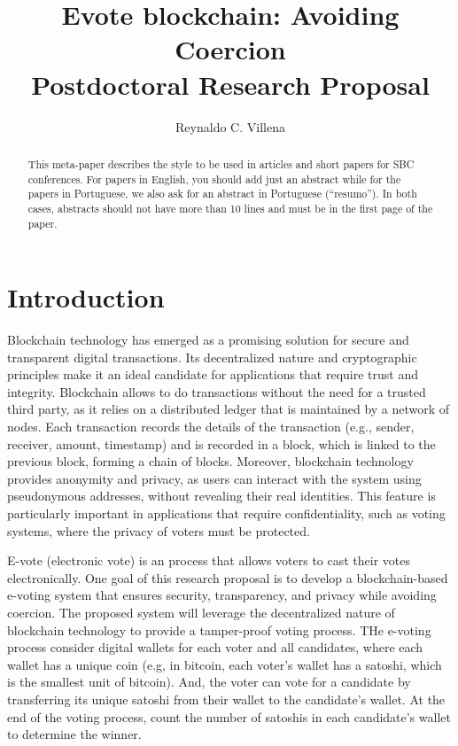 \documentclass[12pt]{article}
\title{Evote blockchain: Avoiding Coercion\\
\textnormal{Postdoctoral Research Proposal}}
\author{Reynaldo C. Villena}
\begin{document}
 

\maketitle

\begin{abstract}
  This meta-paper describes the style to be used in articles and short papers
  for SBC conferences. For papers in English, you should add just an abstract
  while for the papers in Portuguese, we also ask for an abstract in
  Portuguese (``resumo''). In both cases, abstracts should not have more than
  10 lines and must be in the first page of the paper.
\end{abstract}

\section{Introduction}

Blockchain technology has emerged as a promising solution for secure and transparent 
digital transactions. Its decentralized nature and cryptographic principles make it an ideal 
candidate for applications that require trust and integrity.
Blockchain allows to do transactions without the need for a trusted third party, 
as it relies on a distributed ledger that is maintained by a network of nodes. 
Each transaction records the details of the transaction (e.g., sender, receiver, amount, timestamp) and
is recorded in a block, which is linked to the previous block, forming a chain of blocks.
Moreover, blockchain technology provides anonymity and privacy, as users can interact 
with the system using pseudonymous addresses,
without revealing their real identities. This feature is particularly important in applications 
that require confidentiality, such as voting systems, where the privacy of voters must be protected. 

E-vote (electronic vote) is an process that allows voters to cast their votes electronically.
One goal of this research proposal is to develop a blockchain-based e-voting system that 
ensures security, transparency, and privacy while avoiding coercion. The proposed system will 
leverage the decentralized nature of blockchain technology to provide a tamper-proof voting process.
THe e-voting process consider digital wallets for each voter and all candidates, where each wallet has 
a unique coin (e.g, in bitcoin, each voter's wallet has a satoshi, which is the smallest unit of bitcoin).
And, the voter can vote for a candidate by transferring its unique satoshi from their wallet 
to the candidate's wallet. At the end of the voting process, count the number of satoshis in each candidate's 
wallet to determine the winner. 
\end{document}
